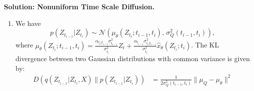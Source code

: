 \documentclass[12pt]{article}
\begin{document}
\begin{enumerate}
\begin{solution}{\bf Solution: Nonuniform Time Scale Diffusion.}
\begin{enumerate}
    Then,
    \[\begin{aligned}
    &\mathbb{E}_{q(\bZ|X)}\left[\log\frac{q(\bZ|X)}{p(X,\bZ)}\right] \\
    &= \mathbb{E}_{q(\bZ|X)}\left[\log\frac{q(Z_0|X) \prod_{i=1}^{T} q(Z_{t_i}|Z_{t_{i-1}})}{p(Z_1) p(X|Z_0) \prod_{i=1}^{T} p(Z_{t_{i-1}}|Z_{t_i})}\right] \\
    &= \mathbb{E}_{q(\bZ|X)}\left[ \log q(Z_0|X) - \log p(X|Z_0) - \log p(Z_1) \right. \\
    & \qquad \left. + \sum_{i=1}^{T} \left( \log q(Z_{t_i}|Z_{t_{i-1}}) - \log p(Z_{t_{i-1}}|Z_{t_i}) \right) \right] \\
    &= \mathbb{E}_{q(\bZ|X)}\left[ \log q(Z_0|X) - \log p(X|Z_0) - \log p(Z_1) \right. \\
    & \qquad \left. + \sum_{i=1}^{T} \left( \log\frac{q(Z_{t_{i-1}}|Z_{t_i}, X)q(Z_{t_i}|X)}{q(Z_{t_{i-1}}|X)} - \log p(Z_{t_{i-1}}|Z_{t_i}) \right) \right] \\
    &= \mathbb{E}_{q(\bZ|X)}\left[ \log q(Z_0|X) - \log p(X|Z_0) - \log p(Z_1) \right. \\
    & \qquad \left. + \sum_{i=1}^{T} \left( \log q(Z_{t_i}|X) - \log q(Z_{t_{i-1}}|X) \right) + \sum_{i=1}^{T} \log\frac{q(Z_{t_{i-1}}|Z_{t_i}, X)}{p(Z_{t_{i-1}}|Z_{t_i})} \right] \\
    &= \mathbb{E}_{q(\bZ|X)}\left[ \log q(Z_0|X) - \log p(X|Z_0) - \log p(Z_1) \right. \\
    & \qquad \left. + (\log q(Z_1|X) - \log q(Z_0|X)) + \sum_{i=1}^{T} \log\frac{q(Z_{t_{i-1}}|Z_{t_i}, X)}{p(Z_{t_{i-1}}|Z_{t_i})} \right] \\
    &=\mathbb{E}_{q(Z_0|X)}[-\log p(X|Z_0)] + D(q(Z_1|X) \| p(Z_1)) + \mathcal{L}(X).
    \end{aligned}\]
    \item We have \[p(Z_{t_{i-1}}|Z_{t_i})\sim \mathcal{N}(\mu_{\theta}(Z_{t_i};t_{i-1},t_i),\,\sigma_Q^2(t_{i-1},t_i)),\] where $\mu_{\theta}(Z_{t_i};t_{i-1},t_i) = \frac{\alpha_{t_i|t_{i-1}}\sigma_{t_{i-1}}^2}{\sigma_{t_i}^2}Z_t+\frac{\alpha_{t_{i-1}}\sigma_{t_i|t_{i-1}}^2}{\sigma_{t_i}^2}\hat{x}_{\theta}(Z_{t_i};t_i)$.
    The KL divergence between two Gaussian distributions with common variance is given by:
    \[
    \begin{aligned}
        D(q(Z_{t_{i-1}}|Z_{t_i}, X)\| p(Z_{t_{i-1}}|Z_{t_i}))&=\frac{1}{2\sigma^2_Q(t_{i-1},t_i)}\|\mu_Q-\mu_{\theta}\|^2\\

\end{aligned}\]
\end{enumerate}
\end{solution}
\end{enumerate}
\end{document}
